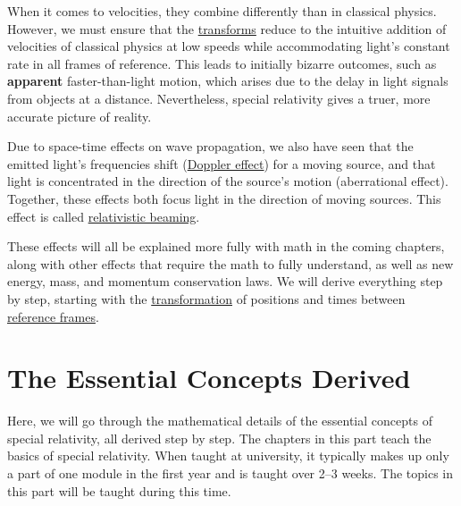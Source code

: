 When it comes to velocities, they combine differently than in classical physics.
However, we must ensure that the \hyperlink{def-transform}{transforms} reduce to the intuitive addition of velocities of classical physics at low speeds while accommodating light's constant rate in all frames of reference.
This leads to initially bizarre outcomes, such as \textbf{apparent} faster-than-light motion, which arises due to the delay in light signals from objects at a distance.
Nevertheless, special relativity gives a truer, more accurate picture of reality.

Due to space-time effects on wave propagation, we also have seen that the emitted light's frequencies shift (\hyperlink{def-doppler-effect}{Doppler effect}) for a moving source, and that light is concentrated in the direction of the source's motion (aberrational effect).
Together, these effects both focus light in the direction of moving sources.
This effect is called \hyperlink{def-relativistic-beaming}{relativistic beaming}.

These effects will all be explained more fully with math in the coming chapters, along with other effects that require the math to fully understand, as well as new energy, mass, and momentum conservation laws.
We will derive everything step by step, starting with the \hyperlink{def-transform}{transformation} of positions and times between \hyperlink{def-Reference-frame}{reference frames}.

\printbibliography[segment=\therefsegment, heading=subbibliography] %





\part{The Essential Concepts Derived} %

Here, we will go through the mathematical details of the essential concepts of special relativity, all derived step by step.
The chapters in this part teach the basics of special relativity.
When taught at university, it typically makes up only a part of one module in the first year and is taught over 2–3 weeks.
The topics in this part will be taught during this time.

